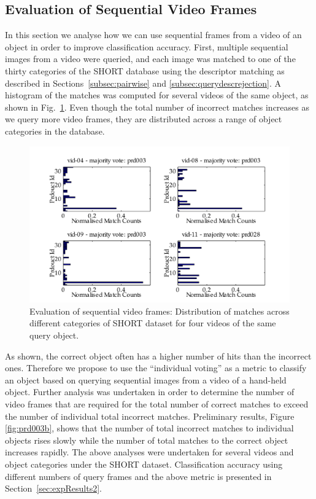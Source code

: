 \subsection{Evaluation of Sequential Video Frames} \label{subsec:evaluationframes}

In this section we analyse how we can use sequential frames from a video of an object in order to improve classification accuracy. First, multiple sequential images from a video were queried, and each image was matched to one of the thirty categories of the SHORT database using the descriptor matching as described in Sections~\ref{subsec:pairwise} and \ref{subsec:querydescrejection}. A histogram of the matches was computed for several videos of the same object, as shown in Fig.~\ref{fig:prd003a}. Even though the total number of incorrect matches increases as we query more video frames, they are distributed across a range of object categories in the database. 

\begin{figure}[htb]
\centering
\includegraphics[width=\linewidth]{./gfx/Chapter02/prd003_distribution_bar-latex.pdf}
\caption{Evaluation of sequential video frames: Distribution of matches across different categories of SHORT dataset for four videos of the same query object.}
\label{fig:prd003a}
\end{figure}


As shown, the correct object often has a higher number of hits than the incorrect ones. Therefore we propose to use the ``individual voting'' as a metric to classify an object based on querying sequential images from a video of a hand-held object. Further analysis was undertaken in order to determine the number of video frames that are required for the total number of correct matches to exceed the number of individual total incorrect matches. Preliminary results, Figure \ref{fig:prd003b}, shows that the number of total incorrect matches to individual objects rises slowly while the number of total matches to the correct object increases rapidly. The above analyses were undertaken for several videos and object categories under the SHORT dataset. Classification accuracy using different numbers of query frames and the above metric is presented in Section~\ref{sec:expResults2}.


